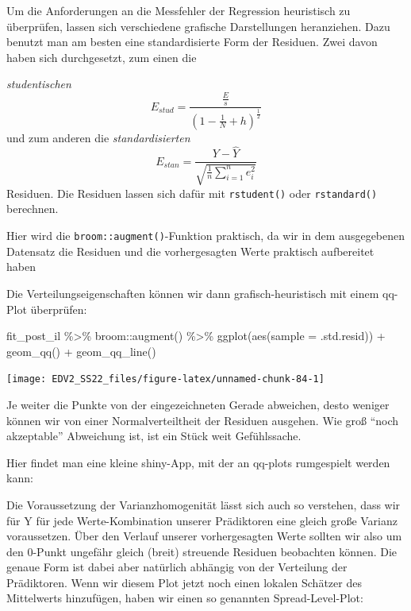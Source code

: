\documentclass[
]{book}
\newenvironment{Shaded}{\begin{snugshade}}{\end{snugshade}}
\newcommand{\AttributeTok}[1]{\textcolor[rgb]{0.77,0.63,0.00}{#1}}
\newcommand{\FunctionTok}[1]{\textcolor[rgb]{0.00,0.00,0.00}{#1}}
\newcommand{\NormalTok}[1]{#1}
\newcommand{\SpecialCharTok}[1]{\textcolor[rgb]{0.00,0.00,0.00}{#1}}
\begin{document}
Um die Anforderungen an die Messfehler der Regression heuristisch zu überprüfen, lassen sich verschiedene grafische Darstellungen heranziehen.
Dazu benutzt man am besten eine standardisierte Form der Residuen.
Zwei davon haben sich durchgesetzt, zum einen die

\emph{studentischen} \[E_{stud}=\frac{\frac{E}{s}}{(1-\frac{1}{N} + h)^{\frac{1}{2}}}\] und zum anderen die \emph{standardisierten} \[E_{stan}=\frac{Y - \hat{Y}}{\sqrt{\frac{1}{n}\sum_{i=1}^n e_i^2}}\] Residuen.
Die Residuen lassen sich dafür mit \texttt{rstudent()} oder \texttt{rstandard()} berechnen.

Hier wird die \texttt{broom::augment()}-Funktion praktisch, da wir in dem ausgegebenen Datensatz die Residuen und die vorhergesagten Werte praktisch aufbereitet haben

Die Verteilungseigenschaften können wir dann grafisch-heuristisch mit einem qq-Plot überprüfen:

\begin{Shaded}
\begin{Highlighting}[]
\NormalTok{fit\_post\_il }\SpecialCharTok{\%\textgreater{}\%} 
\NormalTok{  broom}\SpecialCharTok{::}\FunctionTok{augment}\NormalTok{() }\SpecialCharTok{\%\textgreater{}\%} 
  \FunctionTok{ggplot}\NormalTok{(}\FunctionTok{aes}\NormalTok{(}\AttributeTok{sample =}\NormalTok{ .std.resid)) }\SpecialCharTok{+}
  \FunctionTok{geom\_qq}\NormalTok{() }\SpecialCharTok{+}
  \FunctionTok{geom\_qq\_line}\NormalTok{()}
\end{Highlighting}
\end{Shaded}

\begin{center}\texttt{[image: EDV2\_SS22\_files/figure-latex/unnamed-chunk-84-1]} \end{center}

Je weiter die Punkte von der eingezeichneten Gerade abweichen, desto weniger können wir von einer Normalverteiltheit der Residuen ausgehen. Wie groß ``noch akzeptable'' Abweichung ist, ist ein Stück weit Gefühlssache.

Hier findet man eine kleine shiny-App, mit der an qq-plots rumgespielt werden kann:

Die Voraussetzung der Varianzhomogenität lässt sich auch so verstehen, dass wir für Y für jede Werte-Kombination unserer Prädiktoren eine gleich große Varianz voraussetzen. Über den Verlauf unserer vorhergesagten Werte sollten wir also um den 0-Punkt ungefähr gleich (breit) streuende Residuen beobachten können. Die genaue Form ist dabei aber natürlich abhängig von der Verteilung der Prädiktoren.
Wenn wir diesem Plot jetzt noch einen lokalen Schätzer des Mittelwerts hinzufügen, haben wir einen so genannten Spread-Level-Plot:
\end{document}
